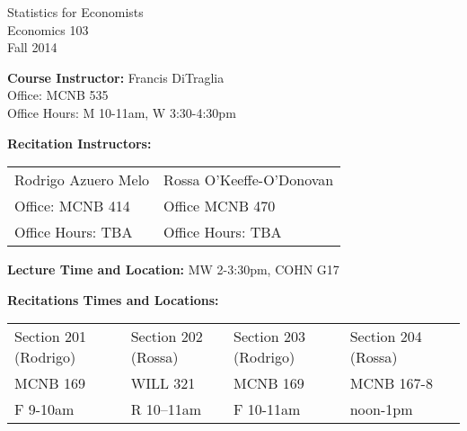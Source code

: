 \documentclass[11pt, letterpaper]{article}
\begin{document}
\thispagestyle{plain}

\begin{center}
\Large
\sc
Statistics for Economists\\
\large
Economics 103\\
\large
Fall 2014\\
\end{center}


\normalsize

\noindent \textbf{Course Instructor:} Francis DiTraglia \\
Office: MCNB 535\\
Office Hours: M 10-11am, W 3:30-4:30pm

\medskip


\noindent \textbf{Recitation Instructors:}

\medskip
\noindent


\begin{tabular}{ll}
Rodrigo Azuero Melo & Rossa O'Keeffe-O'Donovan\\
Office: MCNB 414 & Office MCNB 470\\ 
Office Hours: TBA & Office Hours: TBA\\
\end{tabular}

\medskip


 
\noindent \textbf{Lecture Time and Location:} MW 2-3:30pm, COHN G17  

\medskip

\noindent \textbf{Recitations Times and Locations:}
\medskip \noindent

\begin{tabular}{lllll}
	Section 201 (Rodrigo) & Section 202 (Rossa) & Section 203 (Rodrigo) & Section 204 (Rossa)\\
	MCNB 169 & WILL 321 & MCNB 169 & MCNB 167-8 \\ 
	F 9-10am & R 10--11am & F 10-11am & noon-1pm
\end{tabular}
\end{document}
